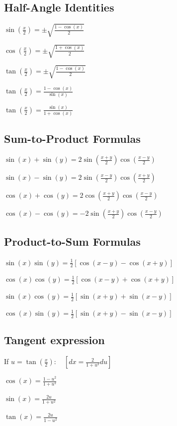 \documentclass[8pt,a4paper]{extarticle}     %
\theoremstyle{definition}
\theoremstyle{definition}
\theoremstyle{definition}
\begin{document}
\begin{multicols}{4}
\subsection{Half-Angle Identities}	
\begin{eqlist}
	\item $\sin\left(\frac{x}{2}\right) = \pm\sqrt{\frac{1-\cos(x)}{2}}$
	\item $\cos\left(\frac{x}{2}\right) = \pm\sqrt{\frac{1+\cos(x)}{2}}$
	\item $\tan\left(\frac{x}{2}\right) = \pm\sqrt{\frac{1-\cos(x)}{2}}$
	\item $\tan\left(\frac{x}{2}\right) = \frac{1-\cos(x)}{\sin(x)}$
	\item $\tan\left(\frac{x}{2}\right) = \frac{\sin(x)}{1+\cos(x)}$
\end{eqlist}

\subsection{Sum-to-Product Formulas}
\begin{eqlist}
	\item $\sin(x) + \sin(y) = 2\sin\left(\frac{x+y}{2}\right)\cos\left(\frac{x-y}{2}\right)$
	\item $\sin(x) - \sin(y) = 2\sin\left(\frac{x-y}{2}\right)\cos\left(\frac{x+y}{2}\right)$
	\item $\cos(x) + \cos(y) = 2\cos\left(\frac{x+y}{2}\right)\cos\left(\frac{x-y}{2}\right)$
	\item $\cos(x) - \cos(y) = -2\sin\left(\frac{x+y}{2}\right)\cos\left(\frac{x-y}{2}\right)$
\end{eqlist}

\subsection{Product-to-Sum Formulas}
\begin{eqlist}
	\item $\sin(x)\sin(y) = \frac{1}{2}\left[\cos(x-y)-\cos(x+y)\right]$
	\item $\cos(x)\cos(y) = \frac{1}{2}\left[\cos(x-y)+\cos(x+y)\right]$
	\item $\sin(x)\cos(y) = \frac{1}{2}\left[\sin(x+y)+\sin(x-y)\right]$
	\item $\cos(x)\sin(y) = \frac{1}{2}\left[\sin(x+y)-\sin(x-y)\right]$
\end{eqlist}

\subsection{Tangent expression}
If $u = \tan(\frac{x}{2}):$ $\ \ \ \left[dx = \frac{2}{1+u^2}du\right]$
\begin{eqlist}
	\item $\cos(x) = \frac{1-u^2}{1+u^2}$
	\item $\sin(x) = \frac{2u}{1+u^2}$
	\item $\tan(x) = \frac{2u}{1-u^2}$
\end{eqlist}


\end{multicols}
\end{document}

